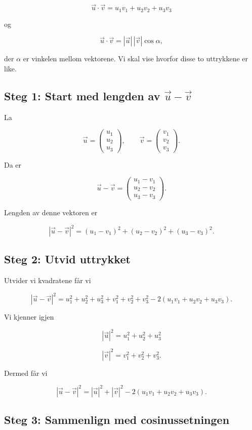 \documentclass[a4paper,12pt]{article}
\begin{document}
\[
\vec u \cdot \vec v = u_1v_1 + u_2v_2 + u_3v_3
\]

og

\[
\vec u \cdot \vec v = |\vec u|\,|\vec v|\cos\alpha,
\]

der $\alpha$ er vinkelen mellom vektorene. Vi skal vise hvorfor disse to uttrykkene er like.

\subsection*{Steg 1: Start med lengden av $\vec u-\vec v$}

La

\[
\vec u =
\begin{pmatrix}
u_1\\
u_2\\
u_3
\end{pmatrix},
\qquad
\vec v =
\begin{pmatrix}
v_1\\
v_2\\
v_3
\end{pmatrix}.
\]

Da er

\[
\vec u - \vec v =
\begin{pmatrix}
u_1-v_1\\
u_2-v_2\\
u_3-v_3
\end{pmatrix}.
\]

Lengden av denne vektoren er

\[
|\vec u-\vec v|^2 =
(u_1-v_1)^2 + (u_2-v_2)^2 + (u_3-v_3)^2.
\]

\subsection*{Steg 2: Utvid uttrykket}

Utvider vi kvadratene får vi

\[
|\vec u-\vec v|^2 =
u_1^2+u_2^2+u_3^2
+
v_1^2+v_2^2+v_3^2
-
2(u_1v_1+u_2v_2+u_3v_3).
\]

Vi kjenner igjen

\[
|\vec u|^2 = u_1^2+u_2^2+u_3^2
\]

\[
|\vec v|^2 = v_1^2+v_2^2+v_3^2.
\]

Dermed får vi

\[
|\vec u-\vec v|^2 =
|\vec u|^2 + |\vec v|^2 - 2(u_1v_1+u_2v_2+u_3v_3).
\]

\subsection*{Steg 3: Sammenlign med cosinussetningen}
\end{document}
